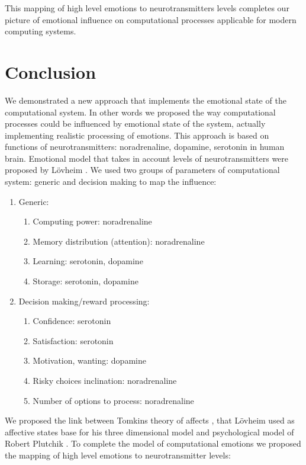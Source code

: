 This mapping of high level emotions to neurotransmitters levels completes our picture of emotional influence on computational processes applicable for modern computing systems.

\section{Conclusion}

We demonstrated a new approach that implements the emotional state of the computational system. In other words we proposed the way computational processes could be influenced by emotional state of the system, actually implementing realistic processing of emotions. This approach is based on functions of neurotransmitters: noradrenaline, dopamine, serotonin in human brain. Emotional model that takes in account levels of neurotransmitters were proposed by L\"{o}vheim \cite{cubeofemotions}. We used two groups of parameters of computational system: generic and decision making to map the influence:

\begin{enumerate}
 \item  Generic:
 \begin{enumerate}
  \item  Computing power: noradrenaline
  \item  Memory distribution (attention): noradrenaline
  \item  Learning: serotonin, dopamine
  \item  Storage: serotonin, dopamine
 \end{enumerate}
 \item  Decision making/reward processing:
 \begin{enumerate}
  \item  Confidence: serotonin
  \item  Satisfaction: serotonin
  \item  Motivation, wanting: dopamine
  \item  Risky choices inclination: noradrenaline
  \item  Number of options to process: noradrenaline
 \end{enumerate}
\end{enumerate}

We proposed the link between Tomkins theory of affects \cite{tomkins1, tomkins2, tomkins3, quest}, that L\"{o}vheim used as affective states base for his three dimensional model and psychological model of Robert Plutchik  \cite{natureofemotions}. To complete the model of computational emotions we proposed the mapping of high level emotions to neurotransmitter levels:

